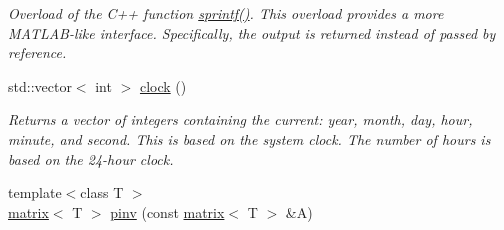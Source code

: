 \begin{DoxyCompactItemize}
\begin{DoxyCompactList}\small\item\em Overload of the C++ function \hyperlink{namespacekeycpp_a9d70a761d33bbc2bdec6b4e0eb43d517}{sprintf()}. This overload provides a more M\-A\-T\-L\-A\-B-\/like interface. Specifically, the output is returned instead of passed by reference. \end{DoxyCompactList}\item 
\hypertarget{namespacekeycpp_aff2feefaeb946dd453d74ff51c66fe67}{std\-::vector$<$ int $>$ \hyperlink{namespacekeycpp_aff2feefaeb946dd453d74ff51c66fe67}{clock} ()}\label{namespacekeycpp_aff2feefaeb946dd453d74ff51c66fe67}

\begin{DoxyCompactList}\small\item\em Returns a vector of integers containing the current\-: year, month, day, hour, minute, and second. This is based on the system clock. The number of hours is based on the 24-\/hour clock. \end{DoxyCompactList}\item 
\hypertarget{namespacekeycpp_ac20bd2ef4fb18cbcdb0f462a89447bd7}{{\footnotesize template$<$class T $>$ }\\\hyperlink{classkeycpp_1_1matrix}{matrix}$<$ T $>$ \hyperlink{namespacekeycpp_ac20bd2ef4fb18cbcdb0f462a89447bd7}{pinv} (const \hyperlink{classkeycpp_1_1matrix}{matrix}$<$ T $>$ \&A)}\label{namespacekeycpp_ac20bd2ef4fb18cbcdb0f462a89447bd7}


\end{DoxyCompactItemize}
